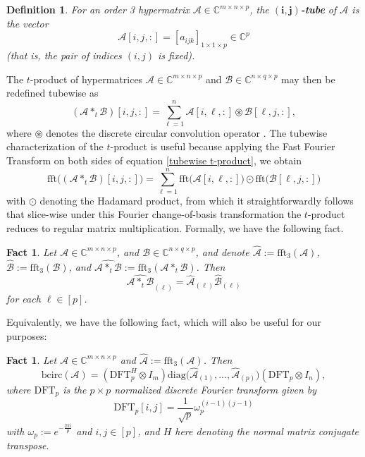 \documentclass[11pt]{article}
\newtheorem{defn}[theorem]{Definition}
\newtheorem{fact}[theorem]{Fact}
\begin{document}
\begin{defn}
    For an order 3 hypermatrix $\mathcal{A}\in \mathbb{C}^{m\times n\times p}$, the \textbf{$\boldsymbol{(i,j)}$-tube} of $\mathcal{A}$ is the vector 
    \[\mathcal{A}[i,j,:] = [a_{ijk}]_{1\times 1\times p}\in \mathbb{C}^p\]
    (that is, the pair of indices $(i,j)$ is fixed). 
\end{defn}
The $t$-product of hypermatrices $\mathcal{A}\in \mathbb{C}^{m\times n\times p}$ and $\mathcal{B}\in \mathbb{C}^{n\times q\times p}$ may then be redefined tubewise as 
\begin{equation}\label{tubewise t-product}
    (\mathcal{A}*_t\mathcal{B})[i,j,:] = \sum\limits_{\ell=1}^n\mathcal{A}[i,\ell,:]\circledast\mathcal{B}[\ell,j,:],
\end{equation}
where $\circledast$ denotes the discrete circular convolution operator \cite{kilmer2013third}. The tubewise characterization of the $t$-product is useful because applying the Fast Fourier Transform on both sides of equation \eqref{tubewise t-product}, we obtain 
\begin{equation}\label{tubewise t-product in frequency domain}
    \mathrm{fft}\big((\mathcal{A}*_t\mathcal{B})[i,j,:]\big) = \sum\limits_{\ell=1}^n\mathrm{fft}\big(\mathcal{A}[i,\ell,:]\big)\odot\mathrm{fft}\big(\mathcal{B}[\ell,j,:]\big)
\end{equation}
with $\odot$ denoting the Hadamard product, from which it straightforwardly follows that slice-wise under this Fourier change-of-basis transformation the $t$-product reduces to regular matrix multiplication. Formally, we have the following fact. 
\begin{fact}\cite{kilmer2013third}\label{t-product in frequency domain slicewise reduces to matrix multiplication}
    Let $\mathcal{A}\in \mathbb{C}^{m\times n\times p}$, and $\mathcal{B}\in \mathbb{C}^{n\times q\times p}$, and denote $\widehat{\mathcal{A}} := \mathrm{fft}_3(\mathcal{A})$, $\widehat{\mathcal{B}} := \mathrm{fft}_3(\mathcal{B})$, and $\widehat{\mathcal{A}*_t\mathcal{B}} := \mathrm{fft}_3(\mathcal{A}*_t\mathcal{B})$. Then 
    \[\widehat{\mathcal{A}*_t\mathcal{B}}_{(\ell)} = \widehat{\mathcal{A}}_{(\ell)}\widehat{\mathcal{B}}_{(\ell)}\]
    for each $\ell\in [p]$. 
\end{fact}
Equivalently, we have the following fact, which will also be useful for our purposes:
\begin{fact}\cite{kilmer2013third}\label{bcirc property}
    Let $\mathcal{A}\in \mathbb{C}^{m\times n\times p}$ and $\widehat{\mathcal{A}} := \mathrm{fft}_3(\mathcal{A})$. Then 
    \[\mathrm{bcirc}(\mathcal{A}) = (\mathrm{DFT}_p^H\otimes I_m)\mathrm{diag}\big(\widehat{\mathcal{A}}_{(1)},...,\widehat{\mathcal{A}}_{(p)}\big)(\mathrm{DFT}_p\otimes I_n),\]
    where $\mathrm{DFT}_p$ is the $p\times p$ normalized discrete Fourier transform given by 
    \[\mathrm{DFT}_p[i,j] = \frac{1}{\sqrt{p}}\omega_p^{(i-1)(j-1)}\] 
    with $\omega_p := e^{-\frac{2\pi i}{p}}$ and $i,j\in [p]$, and $H$ here denoting the normal matrix conjugate transpose. 
\end{fact}
\end{document}
